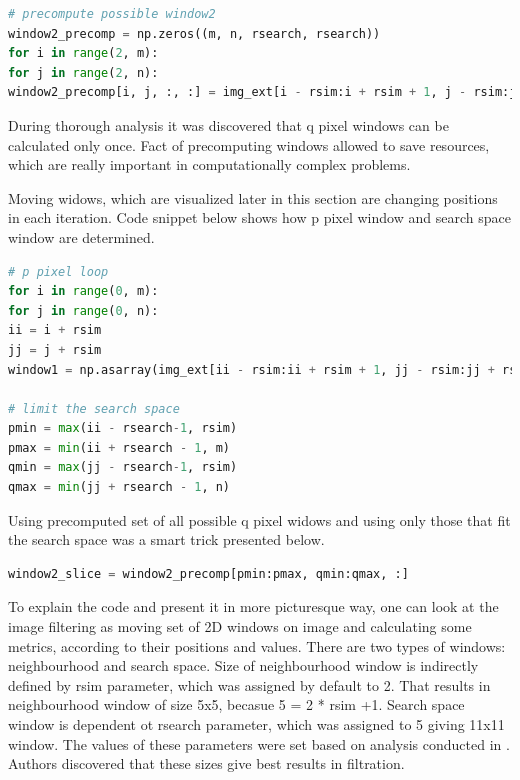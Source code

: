 \begin{lstlisting}[language=Python, caption = Overcoming computation of same matrices in every iteration.]
# precompute possible window2
window2_precomp = np.zeros((m, n, rsearch, rsearch))
for i in range(2, m):
for j in range(2, n):
window2_precomp[i, j, :, :] = img_ext[i - rsim:i + rsim + 1, j - rsim:j + rsim + 1]
\end{lstlisting}

During thorough analysis it was discovered that q pixel windows can be calculated only once. Fact of precomputing windows allowed to save resources, which are really important in computationally complex problems.

Moving widows, which are visualized later in this section are changing positions in each iteration. Code snippet below shows how p pixel window and search space window are determined.

\begin{lstlisting}[language=Python, caption = Calculation of p pixel window and search space area.]
# p pixel loop
for i in range(0, m):
for j in range(0, n):
ii = i + rsim
jj = j + rsim
window1 = np.asarray(img_ext[ii - rsim:ii + rsim + 1, jj - rsim:jj + rsim + 1])

# limit the search space
pmin = max(ii - rsearch-1, rsim)
pmax = min(ii + rsearch - 1, m)
qmin = max(jj - rsearch-1, rsim)
qmax = min(jj + rsearch - 1, n)
\end{lstlisting}

Using precomputed set of all possible q pixel widows and using only those that fit the search space was a smart trick presented below.

\begin{lstlisting}[language=Python, caption = Calculation of q pixel windows within search space area.]
window2_slice = window2_precomp[pmin:pmax, qmin:qmax, :]
\end{lstlisting}

To explain the code and present it in more picturesque way, one can look at the image filtering as moving set of
2D windows on image and calculating some metrics, according to their positions and values. There are two types of windows: neighbourhood and search space. Size of neighbourhood window is indirectly defined by rsim parameter, which was assigned by default to 2. That results in neighbourhood window of size 5x5, becasue 5 = 2 * rsim +1. Search space window is dependent ot rsearch parameter, which was assigned to 5 giving 11x11 window. The values of these parameters were set based on analysis conducted in \cite{5a1}. Authors discovered that these sizes give best results in filtration.

